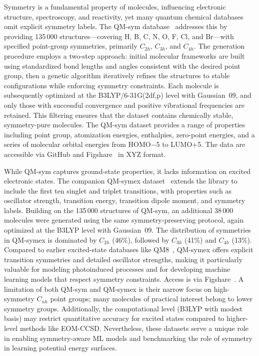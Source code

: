 \documentclass[12pt]{article}
\begin{document}
Symmetry is a fundamental property of molecules, influencing electronic structure, spectroscopy, and reactivity, yet many quantum chemical databases omit explicit symmetry labels. The QM-sym database~\cite{ds29-38} addresses this by providing 135\,000 structures—covering H, B, C, N, O, F, Cl, and Br—with specified point-group symmetries, primarily \(C_{2h}\), \(C_{3h}\), and \(C_{4h}\). The generation procedure employs a two-step approach: initial molecular frameworks are built using standardized bond lengths and angles consistent with the desired point group, then a genetic algorithm iteratively refines the structures to stable configurations while enforcing symmetry constraints. Each molecule is subsequently optimized at the B3LYP/6-31G(2df,p) level with Gaussian~09, and only those with successful convergence and positive vibrational frequencies are retained. This filtering ensures that the dataset contains chemically stable, symmetry-pure molecules. The QM-sym dataset provides a range of properties including point group, atomization energies, enthalpies, zero-point energies, and a series of molecular orbital energies from HOMO\(-\)5 to LUMO+5. The data are accessible via GitHub and Figshare~\cite{ds29-152,ds29-153} in XYZ format.

While QM-sym captures ground-state properties, it lacks information on excited electronic states. The companion QM-symex dataset~\cite{ds30-39} extends the library to include the first ten singlet and triplet transitions, with properties such as oscillator strength, transition energy, transition dipole moment, and symmetry labels. Building on the 135\,000 structures of QM-sym, an additional 38\,000 molecules were generated using the same symmetry-preserving protocol, again optimized at the B3LYP level with Gaussian~09. The distribution of symmetries in QM-symex is dominated by \(C_{2h}\) (46\%), followed by \(C_{3h}\) (41\%) and \(C_{4h}\) (13\%). Compared to earlier excited-state databases like QM8~\cite{ds30-35,ds30-52}, QM-symex offers explicit transition symmetries and detailed oscillator strengths, making it particularly valuable for modeling photoinduced processes and for developing machine learning models that respect symmetry constraints. Access is via Figshare~\cite{ds30-154}. A limitation of both QM-sym and QM-symex is their narrow focus on high-symmetry \(C_{nh}\) point groups; many molecules of practical interest belong to lower symmetry groups. Additionally, the computational level (B3LYP with modest basis) may restrict quantitative accuracy for excited states compared to higher-level methods like EOM-CCSD. Nevertheless, these datasets serve a unique role in enabling symmetry-aware ML models and benchmarking the role of symmetry in learning potential energy surfaces.
\end{document}
